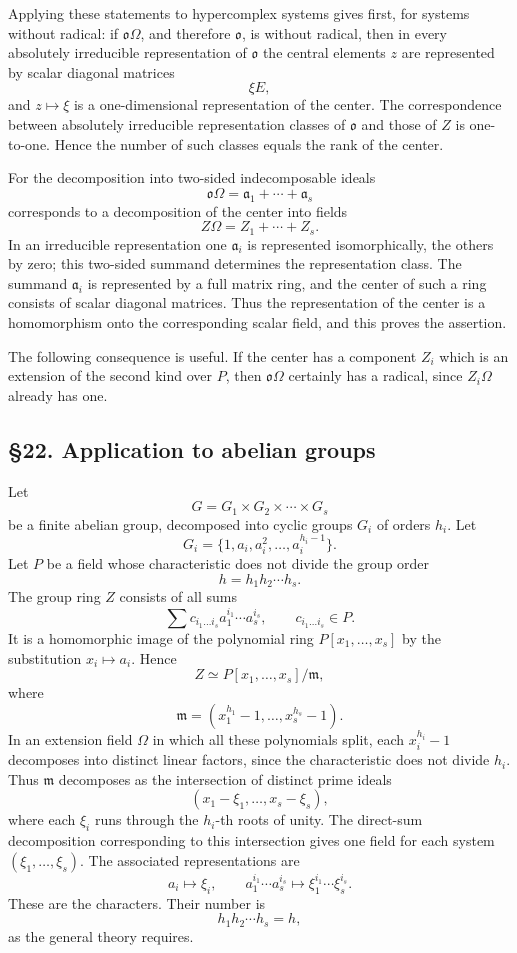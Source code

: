 \documentclass[11pt]{article}
\begin{document}
Applying these statements to hypercomplex systems gives first, for
systems without radical: if \(\mathfrak{o}\Omega\), and therefore
\(\mathfrak{o}\), is without radical, then in every absolutely
irreducible representation of \(\mathfrak{o}\) the central elements
\(z\) are represented by scalar diagonal matrices \[
  \xi E,
\] and \(z\mapsto \xi\) is a one-dimensional representation of the
center. The correspondence between absolutely irreducible representation
classes of \(\mathfrak{o}\) and those of \(Z\) is one-to-one. Hence the
number of such classes equals the rank of the center.

For the decomposition into two-sided indecomposable ideals \[
  \mathfrak{o}\Omega=\mathfrak a_1+\cdots+\mathfrak a_s
\] corresponds to a decomposition of the center into fields \[
  Z\Omega=Z_1+\cdots+Z_s.
\] In an irreducible representation one \(\mathfrak a_i\) is represented
isomorphically, the others by zero; this two-sided summand determines
the representation class. The summand \(\mathfrak a_i\) is represented
by a full matrix ring, and the center of such a ring consists of scalar
diagonal matrices. Thus the representation of the center is a
homomorphism onto the corresponding scalar field, and this proves the
assertion.

The following consequence is useful. If the center has a component
\(Z_i\) which is an extension of the second kind over \(P\), then
\(\mathfrak{o}\Omega\) certainly has a radical, since \(Z_i\Omega\)
already has one.

\subsection{§22. Application to abelian
groups}\label{application-to-abelian-groups}

Let \[
  G=G_1\times G_2\times\cdots\times G_s
\] be a finite abelian group, decomposed into cyclic groups \(G_i\) of
orders \(h_i\). Let \[
  G_i=\{1,a_i,a_i^2,\ldots,a_i^{h_i-1}\}.
\] Let \(P\) be a field whose characteristic does not divide the group
order \[
  h=h_1h_2\cdots h_s.
\] The group ring \(Z\) consists of all sums \[
  \sum c_{i_1\ldots i_s}a_1^{i_1}\cdots a_s^{i_s},
  \qquad c_{i_1\ldots i_s}\in P.
\] It is a homomorphic image of the polynomial ring
\(P[x_1,\ldots,x_s]\) by the substitution \(x_i\mapsto a_i\). Hence \[
  Z\simeq P[x_1,\ldots,x_s]/\mathfrak m,
\] where \[
  \mathfrak m=(x_1^{h_1}-1,\ldots,x_s^{h_s}-1).
\] In an extension field \(\Omega\) in which all these polynomials
split, each \(x_i^{h_i}-1\) decomposes into distinct linear factors,
since the characteristic does not divide \(h_i\). Thus \(\mathfrak m\)
decomposes as the intersection of distinct prime ideals \[
  (x_1-\xi_1,
    \ldots,
    x_s-\xi_s),
\] where each \(\xi_i\) runs through the \(h_i\)-th roots of unity. The
direct-sum decomposition corresponding to this intersection gives one
field for each system \((\xi_1,
\ldots,\xi_s)\). The associated representations are \[
  a_i\mapsto \xi_i,
  \qquad
  a_1^{i_1}\cdots a_s^{i_s}
     \mapsto \xi_1^{i_1}\cdots\xi_s^{i_s}.
\] These are the characters. Their number is \[
  h_1h_2\cdots h_s=h,
\] as the general theory requires.
\end{document}
